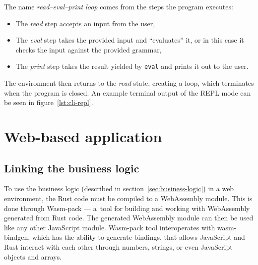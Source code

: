 \documentclass[english,engineering]{wizthesis}
\begin{document}
The name \emph{read–eval–print loop} comes from the steps the program executes:
\begin{itemize}
  \item The \emph{read} step accepts an input from the user,
  \item The \emph{eval} step takes the provided input and ``evaluates'' it,
  or in this case it checks the input against the provided grammar,
  \item The \emph{print} step takes the result yielded by \texttt{eval} and
  prints it out to the user.
\end{itemize}
The environment then returns to the \emph{read} state, creating a loop, which
terminates when the program is closed. An example terminal output of the REPL
mode can be seen in figure~\ref{lst:cli-repl}.

\section{Web-based application} \label{sec:web-based-application}

\subsection{Linking the business logic}

To use the business logic (described in section~\ref{sec:business-logic}) in a
web environment, the Rust code must be compiled to a WebAssembly module. This is
done through Wasm-pack --- a~tool for building and working with WebAssembly
generated from Rust code. The generated WebAssembly module can then be used like
any other JavaScript module. Wasm-pack tool interoperates with wasm-bindgen,
which has the ability to generate bindings, that allows JavaScript and Rust
interact with each other through numbers, strings, or even JavaScript objects
and arrays.
\end{document}
